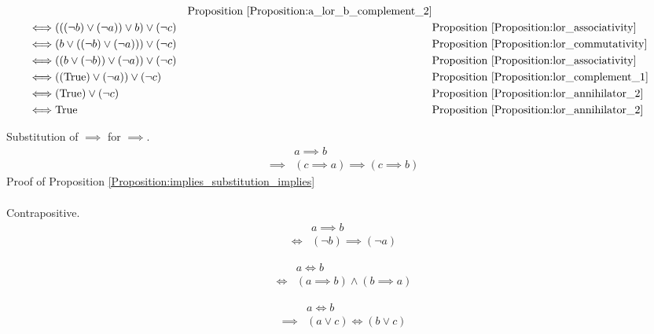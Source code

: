 \begin{prop}
\begin{align*}
& & \text{Proposition \ref{Proposition:a_lor_b_complement_2}} \\
\iff & (((\lnot b) \lor (\lnot a)) \lor b) \lor (\lnot c)
& & \text{Proposition \ref{Proposition:lor_associativity}} \\
\iff & (b \lor ((\lnot b) \lor (\lnot a))) \lor (\lnot c)
& & \text{Proposition \ref{Proposition:lor_commutativity}} \\
\iff & ((b \lor (\lnot b)) \lor (\lnot a)) \lor (\lnot c)
& & \text{Proposition \ref{Proposition:lor_associativity}} \\
\iff & ((\text{True}) \lor (\lnot a)) \lor (\lnot c)
& & \text{Proposition \ref{Proposition:lor_complement_1}} \\
\iff & (\text{True}) \lor (\lnot c)
& & \text{Proposition \ref{Proposition:lor_annihilator_2}} \\
\iff & \text{True}
& & \text{Proposition \ref{Proposition:lor_annihilator_2}} \\
\end{align*}
\end{prop}

\begin{prop}
\label{Proposition:implies_substitution_implies}
Substitution of $\implies$ for $\implies$.
\begin{align*}
& a \implies b \\
\implies & (c \implies a) \implies (c \implies b)
\end{align*}
Proof of Proposition \ref{Proposition:implies_substitution_implies}
\begin{align*}
\end{align*}
\end{prop}

\begin{prop}
\label{Proposition:contrapositive}
Contrapositive.
\begin{align*}
& a \implies b \\
\iff & (\lnot b) \implies (\lnot a)
\end{align*}
\end{prop}

\begin{prop}
\label{Proposition:iff_implies}
\begin{align*}
& a \iff b \\
\iff & (a \implies b) \land (b \implies a)
\end{align*}
\end{prop}

\begin{prop}
\label{Proposition:iff_lor}
\begin{align*}
& a \iff b \\
\implies & (a \lor c) \iff (b \lor c)
\end{align*}
\end{prop}


